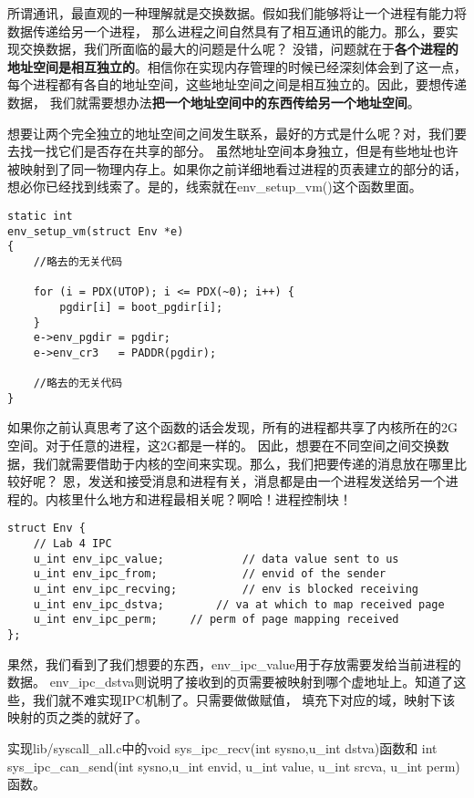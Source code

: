 所谓通讯，最直观的一种理解就是交换数据。假如我们能够将让一个进程有能力将数据传递给另一个进程，
那么进程之间自然具有了相互通讯的能力。那么，要实现交换数据，我们所面临的最大的问题是什么呢？
没错，问题就在于\textbf{各个进程的地址空间是相互独立的}。相信你在实现内存管理的时候已经深刻体会到了这一点，
每个进程都有各自的地址空间，这些地址空间之间是相互独立的。因此，要想传递数据，
我们就需要想办法\textbf{把一个地址空间中的东西传给另一个地址空间}。

想要让两个完全独立的地址空间之间发生联系，最好的方式是什么呢？对，我们要去找一找它们是否存在共享的部分。
虽然地址空间本身独立，但是有些地址也许被映射到了同一物理内存上。如果你之前详细地看过进程的页表建立的部分的话，
想必你已经找到线索了。是的，线索就在env\_setup\_vm()这个函数里面。

\begin{verbatim}
static int
env_setup_vm(struct Env *e)
{
    //略去的无关代码
    
    for (i = PDX(UTOP); i <= PDX(~0); i++) {
        pgdir[i] = boot_pgdir[i];
    }
    e->env_pgdir = pgdir;
    e->env_cr3   = PADDR(pgdir);
    
    //略去的无关代码
}
\end{verbatim}

如果你之前认真思考了这个函数的话会发现，所有的进程都共享了内核所在的2G空间。对于任意的进程，这2G都是一样的。
因此，想要在不同空间之间交换数据，我们就需要借助于内核的空间来实现。那么，我们把要传递的消息放在哪里比较好呢？
恩，发送和接受消息和进程有关，消息都是由一个进程发送给另一个进程的。内核里什么地方和进程最相关呢？啊哈！进程控制块！

\begin{verbatim}
struct Env {
    // Lab 4 IPC
    u_int env_ipc_value;            // data value sent to us
    u_int env_ipc_from;             // envid of the sender
    u_int env_ipc_recving;          // env is blocked receiving
    u_int env_ipc_dstva;        // va at which to map received page
    u_int env_ipc_perm;     // perm of page mapping received
};
\end{verbatim}

果然，我们看到了我们想要的东西，env\_ipc\_value用于存放需要发给当前进程的数据。
env\_ipc\_dstva则说明了接收到的页需要被映射到哪个虚地址上。知道了这些，我们就不难实现IPC机制了。只需要做做赋值，
填充下对应的域，映射下该映射的页之类的就好了。

\begin{exercise}
实现lib/syscall\_all.c中的void sys\_ipc\_recv(int sysno,u\_int dstva)函数和
int sys\_ipc\_can\_send(int sysno,u\_int envid, u\_int value, u\_int srcva, u\_int perm)函数。
\end{exercise}

